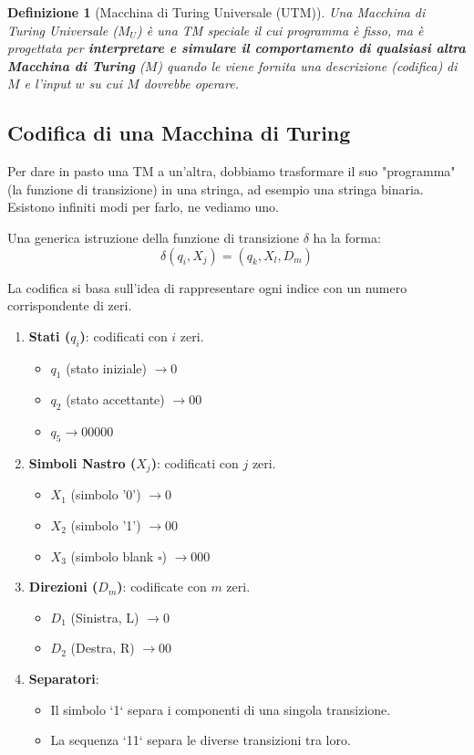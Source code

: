 \documentclass[a4paper]{article}
\newtheorem{definition}{Definizione}
\newcommand{\blankS}{\ensuremath{\square}}
\theoremstyle{remark} %
\begin{document}
\begin{definition}[Macchina di Turing Universale (UTM)]
Una Macchina di Turing Universale ($M_U$) è una TM speciale il cui programma è fisso, ma è progettata per \textbf{interpretare e simulare il comportamento di qualsiasi altra Macchina di Turing} ($M$) quando le viene fornita una descrizione (codifica) di $M$ e l'input $w$ su cui $M$ dovrebbe operare.
\end{definition}

\subsection{Codifica di una Macchina di Turing}

Per dare in pasto una TM a un'altra, dobbiamo trasformare il suo "programma" (la funzione di transizione) in una stringa, ad esempio una stringa binaria. Esistono infiniti modi per farlo, ne vediamo uno.

Una generica istruzione della funzione di transizione $\delta$ ha la forma:
\[ \delta(q_i, X_j) = (q_k, X_l, D_m) \]

La codifica si basa sull'idea di rappresentare ogni indice con un numero corrispondente di zeri.
\begin{enumerate}
    \item \textbf{Stati ($q_i$)}: codificati con $i$ zeri.
    \begin{itemize}
        \item $q_1$ (stato iniziale) $\rightarrow 0$
        \item $q_2$ (stato accettante) $\rightarrow 00$
        \item $q_5 \rightarrow 00000$
    \end{itemize}
    \item \textbf{Simboli Nastro ($X_j$)}: codificati con $j$ zeri.
    \begin{itemize}
        \item $X_1$ (simbolo '0') $\rightarrow 0$
        \item $X_2$ (simbolo '1') $\rightarrow 00$
        \item $X_3$ (simbolo blank $\blankS$) $\rightarrow 000$
    \end{itemize}
    \item \textbf{Direzioni ($D_m$)}: codificate con $m$ zeri.
    \begin{itemize}
        \item $D_1$ (Sinistra, L) $\rightarrow 0$
        \item $D_2$ (Destra, R) $\rightarrow 00$
    \end{itemize}
    \item \textbf{Separatori}:
    \begin{itemize}
        \item Il simbolo `1` separa i componenti di una singola transizione.
        \item La sequenza `11` separa le diverse transizioni tra loro.
    \end{itemize}
\end{enumerate}
\end{document}
